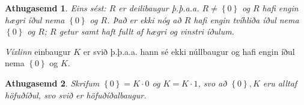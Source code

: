 \documentclass[a4paper,icelandic,11pt]{book}
\theoremstyle{plain}
\newtheorem*{ath}{Athugasemd}
\begin{document}
\begin{ath}
  Eins sést: $R$ er deilibaugur þ.þ.a.a. $R\neq \left\{ 0 \right\}$ og
  $R$ hafi engin \emph{hægri} íðul nema $\left\{ 0 \right\}$ og $R$. Það er
  \emph{ekki nóg} að $R$ hafi engin \emph{tvíhliða} íðul nema $\left\{ 0
  \right\}$ og $R$; $R$ getur samt haft fullt af hægri og vinstri íðulum.
\end{ath}
\begin{fylgisetn}
  \emph{Víxlinn} einbaugur $K$ er svið þ.þ.a.a. hann sé ekki núllbaugur og hafi
  engin íðul nema $\left\{ 0 \right\}$ og $K$.
\end{fylgisetn}
\begin{ath}
  Skrifum $\left\{ 0 \right\} = K\cdot 0$ og $K = K\cdot 1$, svo að $\left\{
  0 \right\}, K$ eru alltaf höfuðíðul, svo svið er höfuðíðalbaugur.
\end{ath}
\end{document}
